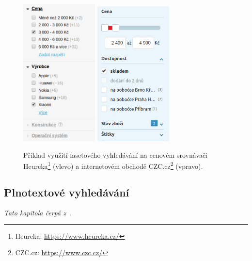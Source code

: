 \begin{figure}[H]
	\centering
	\includegraphics[width=0.35\textwidth]{obrazky-figures/heureka-facet.png}
	\hspace{0.5cm}
	\includegraphics[width=0.35\textwidth]{obrazky-figures/czc-facet.png}
	\caption{Příklad využití fasetového vyhledávání na cenovém srovnávači Heureka\protect\footnote{Heureka: \url{https://www.heureka.cz/}} (vlevo) a internetovém obchodě CZC.cz\protect\footnote{CZC.cz: \url{https://www.czc.cz/}} (vpravo).}
\end{figure}


\subsection{Plnotextové vyhledávání}
\emph{Tato kapitola čerpá z~\cite{bib:elastic-defnitive}}.

